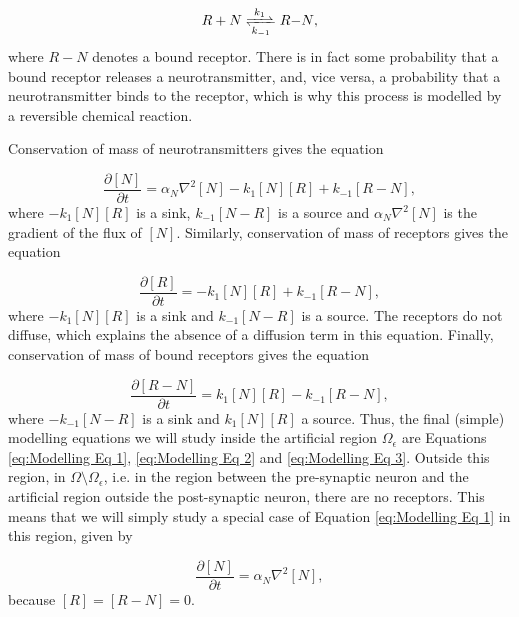 \documentclass{article}
\begin{document}
\begin{equation}
    \ce{$R$ + $N$ <=>[$k_1$][$k_{-1}$] $R-N$},
\end{equation}
where $R-N$ denotes a bound receptor. There is in fact some probability that a bound receptor releases a neurotransmitter, and, vice versa, a probability that a neurotransmitter binds to the receptor, which is why this process is modelled by a reversible chemical reaction. 

Conservation of mass of neurotransmitters gives the equation 

\begin{equation}\label{eq:Modelling Eq 1}
    \frac{\partial [N]}{\partial t} = \alpha_N\nabla^2[N]- k_1[N][R] + k_{-1}[R-N],
\end{equation}
where $-k_{1}[N][R]$ is a sink, $k_{-1}[N-R]$ is a source and $\alpha_N\nabla^2[N]$ is the gradient of the flux of $[N]$. Similarly, conservation of mass of receptors gives the equation 

\begin{equation}\label{eq:Modelling Eq 2}
    \frac{\partial [R]}{\partial t} = - k_1[N][R] + k_{-1}[R-N], 
\end{equation}
where $-k_{1}[N][R]$ is a sink and $k_{-1}[N-R]$ is a source. The receptors do not diffuse, which explains the absence of a diffusion term in this equation. Finally, conservation of mass of bound receptors gives the equation 

\begin{equation}\label{eq:Modelling Eq 3}
    \frac{\partial [R-N]}{\partial t} = k_1[N][R] - k_{-1}[R-N],
\end{equation}
where $-k_{-1}[N-R]$ is a sink and $k_{1}[N][R]$ a source. Thus, the final (simple) modelling equations we will study inside the artificial region $\Omega_\epsilon$ are Equations \eqref{eq:Modelling Eq 1}, \eqref{eq:Modelling Eq 2} and \eqref{eq:Modelling Eq 3}. Outside this region, in $\Omega \setminus \Omega_\epsilon$, i.e. in the region between the pre-synaptic neuron and the artificial region outside the post-synaptic neuron, there are no receptors. This means that we will simply study a special case of Equation \eqref{eq:Modelling Eq 1} in this region, given by 

\begin{equation}
    \frac{\partial [N]}{\partial t} = \alpha_N\nabla^2[N],
    \label{Eq: Outside Syn. Cleft.}
\end{equation}
because $[R] = [R-N] = 0$.
\end{document}
